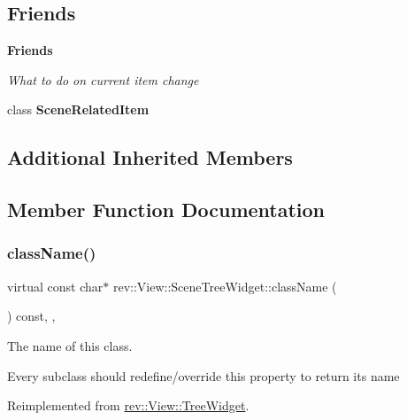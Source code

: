 \subsection*{Friends}
\begin{Indent}\textbf{ Friends}\par
{\em What to do on current item change }\begin{DoxyCompactItemize}
\item 
\mbox{\label{classrev_1_1_view_1_1_scene_tree_widget_ad1c5573b96cfe6bdb3e25efd6b90c7a2}} 
class {\bfseries Scene\+Related\+Item}
\end{DoxyCompactItemize}
\end{Indent}
\subsection*{Additional Inherited Members}


\subsection{Member Function Documentation}
\mbox{\label{classrev_1_1_view_1_1_scene_tree_widget_af0acbcb9d6cb9b0b209d0a9e11f563f3}} 
\subsubsection{\texorpdfstring{className()}{className()}}
{\footnotesize\ttfamily virtual const char$\ast$ rev\+::\+View\+::\+Scene\+Tree\+Widget\+::class\+Name (\begin{DoxyParamCaption}{ }\end{DoxyParamCaption}) const\hspace{0.3cm}{\ttfamily [inline]}, {\ttfamily [override]}, {\ttfamily [virtual]}}



The name of this class. 

Every subclass should redefine/override this property to return its name 

Reimplemented from \mbox{\hyperlink{classrev_1_1_view_1_1_tree_widget_aedde04f44badced7c60f0e1570e3d0b2}{rev\+::\+View\+::\+Tree\+Widget}}.

